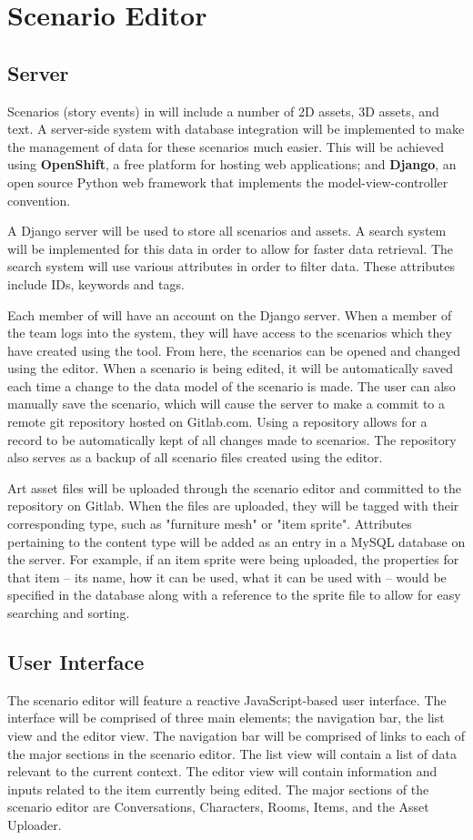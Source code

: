 \chapter{Scenario Editor}

\section{Server}
Scenarios (story events) in \ourgame{} will include a number of 2D assets, 3D assets, and text. A server-side system with database integration will be implemented to make the management of data for these scenarios much easier. This will be achieved using \textbf{OpenShift}, a free platform for hosting web applications; and \textbf{Django}, an open source Python web framework that implements the model-view-controller convention.

A Django server will be used to store all scenarios and assets. A search system will be implemented for this data in order to allow for faster data retrieval. The search system will use various attributes in order to filter data. These attributes include IDs, keywords and tags.

Each member of \ourteam{} will have an account on the Django server. When a member of the team logs into the system, they will have access to the scenarios which they have created using the tool. From here, the scenarios can be opened and changed using the editor. When a scenario is being edited, it will be automatically saved each time a change to the data model of the scenario is made. The user can also manually save the scenario, which will cause the server to make a commit to a remote git repository hosted on Gitlab.com. Using a repository allows for a record to be automatically kept of all changes made to scenarios. The repository also serves as a backup of all scenario files created using the editor.

Art asset files will be uploaded through the scenario editor and committed to the repository on Gitlab. When the files are uploaded, they will be tagged with their corresponding type, such as "furniture mesh" or "item sprite". Attributes pertaining to the content type will be added as an entry in a MySQL database on the server. For example, if an item sprite were being uploaded, the properties for that item -- its name, how it can be used, what it can be used with -- would be specified in the database along with a reference to the sprite file to allow for easy searching and sorting.

\section{User Interface}
The scenario editor will feature a reactive JavaScript-based user interface. The interface will be comprised of three main elements; the navigation bar, the list view and the editor view. The navigation bar will be comprised of links to each of the major sections in the scenario editor. The list view will contain a list of data relevant to the current context. The editor view will contain information and inputs related to the item currently being edited. The major sections of the scenario editor are Conversations, Characters, Rooms, Items, and the Asset Uploader. 

